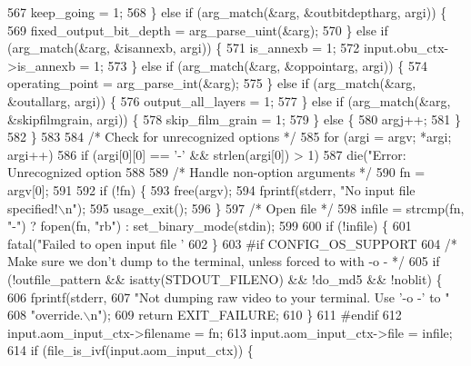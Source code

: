 \begin{DoxyCodeInclude}
{{{{{{{{{{{{{{{{{{{{{{{{{{{{567       keep\_going = 1;
568     \} \textcolor{keywordflow}{else} \textcolor{keywordflow}{if} (arg\_match(&arg, &outbitdeptharg, argi)) \{
569       fixed\_output\_bit\_depth = arg\_parse\_uint(&arg);
570     \} \textcolor{keywordflow}{else} \textcolor{keywordflow}{if} (arg\_match(&arg, &isannexb, argi)) \{
571       is\_annexb = 1;
572       input.obu\_ctx->is\_annexb = 1;
573     \} \textcolor{keywordflow}{else} \textcolor{keywordflow}{if} (arg\_match(&arg, &oppointarg, argi)) \{
574       operating\_point = arg\_parse\_int(&arg);
575     \} \textcolor{keywordflow}{else} \textcolor{keywordflow}{if} (arg\_match(&arg, &outallarg, argi)) \{
576       output\_all\_layers = 1;
577     \} \textcolor{keywordflow}{else} \textcolor{keywordflow}{if} (arg\_match(&arg, &skipfilmgrain, argi)) \{
578       skip\_film\_grain = 1;
579     \} \textcolor{keywordflow}{else} \{
580       argj++;
581     \}
582   \}
583 
584   \textcolor{comment}{/* Check for unrecognized options */}
585   \textcolor{keywordflow}{for} (argi = argv; *argi; argi++)
586     \textcolor{keywordflow}{if} (argi[0][0] == \textcolor{charliteral}{'-'} && strlen(argi[0]) > 1)
587       die(\textcolor{stringliteral}{"Error: Unrecognized option %
588 
589   \textcolor{comment}{/* Handle non-option arguments */}
590   fn = argv[0];
591 
592   \textcolor{keywordflow}{if} (!fn) \{
593     free(argv);
594     fprintf(stderr, \textcolor{stringliteral}{"No input file specified!\(\backslash\)n"});
595     usage\_exit();
596   \}
597   \textcolor{comment}{/* Open file */}
598   infile = strcmp(fn, \textcolor{stringliteral}{"-"}) ? fopen(fn, \textcolor{stringliteral}{"rb"}) : set\_binary\_mode(stdin);
599 
600   \textcolor{keywordflow}{if} (!infile) \{
601     fatal(\textcolor{stringliteral}{"Failed to open input file '%
602   \}
603 \textcolor{preprocessor}{#if CONFIG\_OS\_SUPPORT}
604   \textcolor{comment}{/* Make sure we don't dump to the terminal, unless forced to with -o - */}
605   \textcolor{keywordflow}{if} (!outfile\_pattern && isatty(STDOUT\_FILENO) && !do\_md5 && !noblit) \{
606     fprintf(stderr,
607             \textcolor{stringliteral}{"Not dumping raw video to your terminal. Use '-o -' to "}
608             \textcolor{stringliteral}{"override.\(\backslash\)n"});
609     \textcolor{keywordflow}{return} EXIT\_FAILURE;
610   \}
611 \textcolor{preprocessor}{#endif}
612   input.aom\_input\_ctx->filename = fn;
613   input.aom\_input\_ctx->file = infile;
614   \textcolor{keywordflow}{if} (file\_is\_ivf(input.aom\_input\_ctx)) \{
}}}}}}}}}}}}}}}}}}}}}}}}}}}}}}
\end{DoxyCodeInclude}

